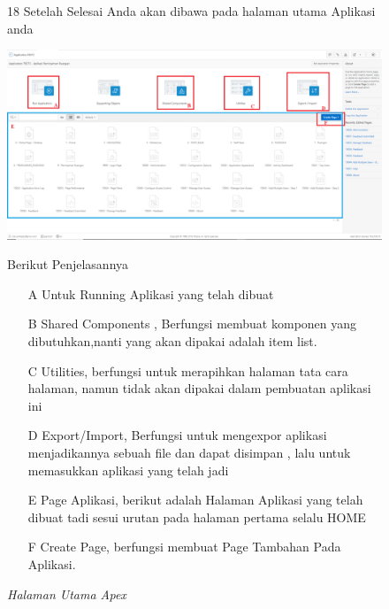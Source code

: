 \begin{itemize}
        \begin{figure}[!htbp]
        \item[18]Setelah Selesai Anda akan dibawa pada halaman utama Aplikasi anda
        \begin{center}
        \includegraphics[scale=0.2]{figures/halaman_aplikasi_utiltis.png}
        \caption{\textit{Halaman Utama Apex}}
        \end{center}
        Berikut Penjelasannya
            \begin{itemize}
                \item[A]Untuk Running Aplikasi yang telah dibuat
                \item[B]Shared Components , Berfungsi membuat komponen yang dibutuhkan,nanti yang akan dipakai adalah item list.
                \item[C]Utilities, berfungsi untuk merapihkan halaman tata cara halaman, namun tidak akan dipakai dalam pembuatan aplikasi ini
                \item[D]Export/Import, Berfungsi untuk mengexpor aplikasi menjadikannya sebuah file dan dapat disimpan , lalu untuk memasukkan aplikasi yang telah jadi
                \item[E]Page Aplikasi, berikut adalah Halaman Aplikasi yang telah dibuat tadi sesui urutan pada halaman pertama selalu HOME
                \item[F]Create Page, berfungsi membuat Page Tambahan Pada Aplikasi.
            \end{itemize}
        \end{figure}
        

\end{itemize}
